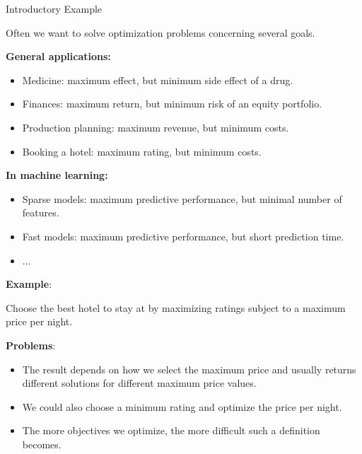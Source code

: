 \begin{frame}[allowframebreaks]{Introductory Example}

Often we want to solve optimization problems concerning several goals.

    \vspace{0.5cm}
    \textbf{General applications:}
\begin{itemize}
\item Medicine: maximum effect, but minimum side effect of a drug.
\item Finances: maximum return, but minimum risk of an equity portfolio.
\item Production planning: maximum revenue, but minimum costs.
\item Booking a hotel: maximum rating, but minimum costs.
\end{itemize}

\vspace{0.5cm}
    \textbf{In machine learning:}
\begin{itemize}
\item Sparse models: maximum predictive performance, but minimal number of features.
\item Fast models: maximum predictive performance, but short prediction time.
\item ...
\end{itemize}


\vspace*{0.2cm}

\framebreak

\textbf{Example}:

Choose the best hotel to stay at by maximizing ratings subject to a maximum price per night.

\vspace*{0.5cm}

 \textbf{Problems}:

\begin{itemize}
 \item The result depends on how we select the maximum price and usually returns different solutions for different maximum price values.
 \item We could also choose a minimum rating and optimize the price per night.
 \item The more objectives we optimize, the more difficult such a definition becomes.
\end{itemize}


\end{frame}
